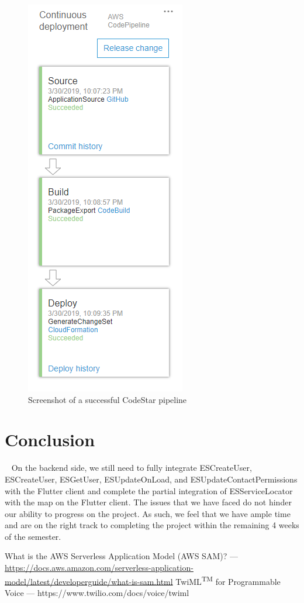 \documentclass[10pt, a4paper]{article}
\begin{document}
\begin{figure}[H]
  \centerline{
  	\includegraphics[scale=.8]{img/pipeline.PNG}
  }  
  \caption{Screenshot of a successful CodeStar pipeline}
\end{figure}

\section{Conclusion}
\par ~ On the backend side, we still need to fully integrate ESCreateUser, ESCreateUser, ESGetUser, ESUpdateOnLoad, and ESUpdateContactPermissions with the Flutter client and complete the partial integration of ESServiceLocator with the map on the Flutter client. The issues that we have faced do not hinder our ability to progress on the project. As such, we feel that we have ample time and are on the right track to completing the project within the remaining 4 weeks of the semester.

\begin{thebibliography}{9}
What is the AWS Serverless Application Model (AWS SAM)? --- \url{https://docs.aws.amazon.com/serverless-application-model/latest/developerguide/what-is-sam.html}
TwiML\textsuperscript{TM} for Programmable Voice --- https://www.twilio.com/docs/voice/twiml

\end{thebibliography}
\end{document}
